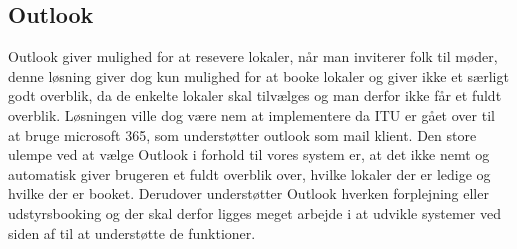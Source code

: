 \subsection{Outlook}
Outlook giver mulighed for at resevere lokaler, når man inviterer folk til møder, denne løsning giver dog kun mulighed for at booke lokaler og giver ikke et særligt godt overblik, da de enkelte lokaler skal tilvælges og man derfor ikke får et fuldt overblik. Løsningen ville dog være nem at implementere da ITU er gået over til at bruge microsoft 365, som understøtter outlook som mail klient. Den store ulempe ved at vælge Outlook i forhold til vores system er, at det ikke nemt og automatisk giver brugeren et fuldt overblik over, hvilke lokaler der er ledige og hvilke der er booket. Derudover understøtter Outlook hverken forplejning eller udstyrsbooking og der skal derfor ligges meget arbejde i at udvikle systemer ved siden af til at understøtte de funktioner.



